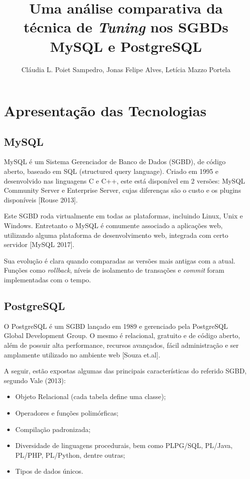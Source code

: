 \documentclass[12pt]{article}
\title{Uma análise comparativa da técnica de \textit{Tuning} nos SGBDs MySQL e PostgreSQL}
\author{Cláudia L. Poiet Sampedro\inst{1}, Jonas Felipe Alves\inst{2}, Letícia Mazzo Portela\inst{3}}
\begin{document}
 

\maketitle

  
     
  


\section{Apresentação das Tecnologias}
    \subsection{MySQL}
        MySQL é um Sistema Gerenciador de Banco de Dados (SGBD), de código aberto, baseado em SQL (structured query language). Criado em 1995 e desenvolvido nas linguagens C e C++, este está disponível em 2 versões: MySQL Community Server e Enterprise Server, cujas diferenças são o custo e os plugins disponíveis [Rouse 2013].
        
        Este SGBD roda virtualmente em todas as plataformas, incluindo Linux, Unix e Windows. Entretanto o MySQL é comumente associado a aplicações web, utilizando alguma plataforma de desenvolvimento web, integrada com certo servidor [MySQL 2017].
        
        Sua evolução é clara quando comparadas as versões mais antigas com a atual. Funções como \textit{rollback}, níveis de isolamento de transações e \textit{commit} foram implementadas com o tempo.
    \subsection{PostgreSQL}
        O PostgreSQL é um SGBD lançado em 1989 e gerenciado pela PostgreSQL Global Development Group. O mesmo é relacional, gratuito e de código aberto, além de possuir alta performance, recursos avançados, fácil administração e ser amplamente utilizado no ambiente web [Souza et.al].
        
    	A seguir, estão expostas algumas das principais características do referido SGBD, segundo Vale (2013):
            \begin{itemize}
                \item Objeto Relacional (cada tabela define uma classe);
                \item Operadores e funções polimórficas;
                \item Compilação padronizada;
                \item Diversidade de linguagens procedurais, bem como PLPG/SQL, PL/Java, PL/PHP, PL/Python, dentre outras;
                \item Tipos de dados únicos.
            \end{itemize} 
\end{document}
